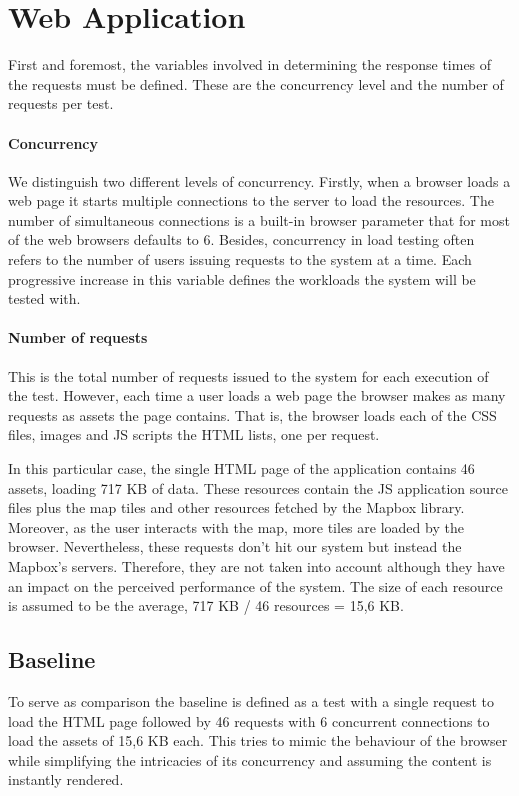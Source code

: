 \section{Web Application}

First and foremost, the variables involved in determining the response times of the requests must be defined. These are the concurrency level and the number of requests per test.

\paragraph{Concurrency} We distinguish two different levels of concurrency. Firstly, when a browser loads a web page it starts multiple connections to the server to load the resources. The number of simultaneous connections is a built-in browser parameter that for most of the web browsers defaults to 6. Besides, concurrency in load testing often refers to the number of users issuing requests to the system at a time. Each progressive increase in this variable defines the workloads the system will be tested with.

\paragraph{Number of requests} This is the total number of requests issued to the system for each execution of the test. However, each time a user loads a web page the browser makes as many requests as assets the page contains. That is, the browser loads each of the CSS files, images and JS scripts the HTML lists, one per request.

In this particular case, the single HTML page of the application contains 46 assets, loading 717 KB of data. These resources contain the JS application source files plus the map tiles and other resources fetched by the Mapbox library. Moreover, as the user interacts with the map, more tiles are loaded by the browser. Nevertheless, these requests don't hit our system but instead the Mapbox's servers. Therefore, they are not taken into account although they have an impact on the perceived performance of the system. The size of each resource is assumed to be the average, 717 KB / 46 resources = 15,6 KB.

\subsection*{Baseline}

To serve as comparison the baseline is defined as a test with a single request to load the HTML page followed by 46 requests with 6 concurrent connections to load the assets of 15,6 KB each. This tries to mimic the behaviour  of the browser while simplifying the intricacies of its concurrency and assuming the content is instantly rendered.

